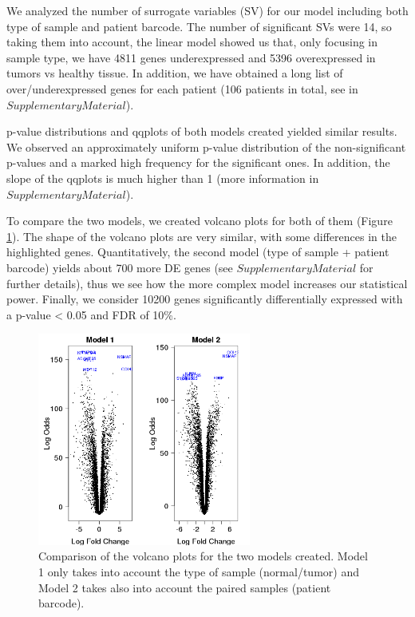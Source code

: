\documentclass[9pt,twocolumn,twoside]{gsajnl}
\begin{document}
We analyzed the number of surrogate variables (SV) for our model including both type of sample and patient barcode. The number of significant SVs were 14, so taking them into account, the linear model showed us that, only focusing in sample type, we have 4811 genes underexpressed and 5396 overexpressed in tumors vs healthy tissue. In addition, we have obtained a long list of over/underexpressed genes for each patient (106 patients in total, see in $Supplementary Material$).
\vspace{2mm}

p-value distributions and qqplots of both models created yielded similar results. We observed an approximately uniform p-value distribution of the non-significant p-values and a marked high frequency for the significant ones. In addition, the slope of the qqplots is much higher than 1 (more information in $Supplementary Material$). 
\vspace{2mm}

To compare the two models, we created volcano plots for both of them (Figure \ref{fig:spectrum}). The shape of the volcano plots are very similar, with some differences in the highlighted genes. Quantitatively, the second model (type of sample + patient barcode) yields about 700 more DE genes (see $Supplementary Material$ for further details), thus we see how the more complex model increases our statistical power. Finally, we consider 10200 genes significantly differentially expressed with a p-value < 0.05 and FDR of 10\%.

\begin{figure}[htbp]
\centering
\includegraphics[width=70mm]{volcanotex-1}
\caption{Comparison of the volcano plots for the two models created. Model 1 only takes into account the type of sample (normal/tumor) and Model 2 takes also into account the paired samples (patient barcode).}%
\label{fig:spectrum}
\end{figure}
\end{document}
